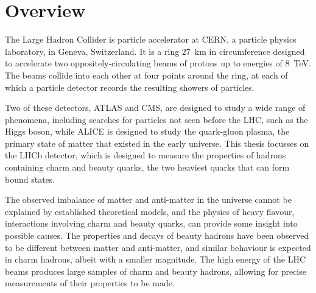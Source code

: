 \chapter{Overview}
\label{chap:intro:overview}

The Large Hadron Collider is particle accelerator at CERN, a particle physics 
laboratory, in Geneva, Switzerland.
It is a ring \SI{27}{\kilo\metre} in circumference designed to accelerate two 
oppositely-circulating beams of protons up to energies of \SI{8}{\TeV}.
The beams collide into each other at four points around the ring, at each of 
which a particle detector records the resulting showers of particles.


Two of these detectors, ATLAS and CMS, are designed to study a wide range of 
phenomena, including searches for particles not seen before the \ac{LHC}, such 
as the Higgs boson, while ALICE is designed to study the quark-gluon plasma, 
the primary state of matter that existed in the early universe.
This thesis focusses on the LHCb detector, which is designed to measure the 
properties of hadrons containing charm and beauty quarks, the two heaviest 
quarks that can form bound states.

The observed imbalance of matter and anti-matter in the universe cannot be 
explained by established theoretical models, and the physics of heavy flavour, 
interactions involving charm and beauty quarks, can provide some insight into 
possible causes.
The properties and decays of beauty hadrons have been observed to be different 
between matter and anti-matter, and similar behaviour is expected in charm 
hadrons, albeit with a smaller magnitude.
The high energy of the \ac{LHC} beams produces large samples of charm and 
beauty hadrons, allowing for precise measurements of their properties to be 
made.

